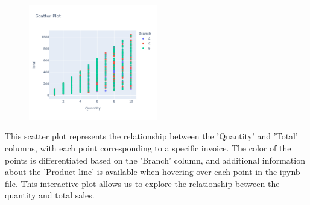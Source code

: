 \begin{figure}[h]
    \centering
    \includegraphics[width=0.5\textwidth]{Chapters/ch1/ch_1_scatter_plot_1.png}
\end{figure}
This scatter plot represents the relationship between the 'Quantity' and 'Total' columns, with each point corresponding to a specific invoice. The color of the points is differentiated based on the 'Branch' column, and additional information about the 'Product line' is available when hovering over each point in the ipynb file.
This interactive plot allows us to explore the relationship between the quantity and total sales.



